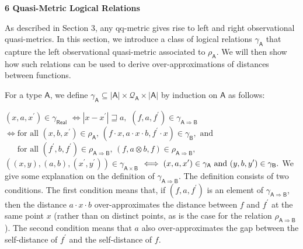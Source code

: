  
 
 


 
\par\medskip\noindent\textbf{6 Quasi-Metric Logical Relations}\par
 
 
As described in Section 3, any qq-metric gives rise to left and right observational quasi-metrics. In this section, we introduce a class of logical relations $\gamma_{\mathsf{A}}$ that capture the left observational quasi-metric associated to $\rho_{{\mathsf{A}}}$. We will then show how such relations can be used to derive over-approximations of distances between functions.\par
 
 
 
For a type $\mathsf{A}$, we define $\gamma_{\mathsf{A}}\subseteq|\mathsf{A}|\times\mathcal{Q}_{\mathsf{A}}\times|%
\mathsf{A}|$ by induction on $\mathsf{A}$ as follows:\par
    $\displaystyle(x,a,x^{\prime})\in\gamma_{\mathsf{Real}}$ $\displaystyle\iff|x-x^{\prime}|\sqsupseteq a,$     $\displaystyle(f,a,f^{\prime})\in\gamma_{\mathsf{A}\Rightarrow\mathsf{B}}$ $\displaystyle\iff\text{for all }(x,b,x^{\prime})\in\rho_{\mathsf{A}},\,(f\cdot
x%
,a\cdot x\cdot b,f^{\prime}\cdot x)\in\gamma_{\mathsf{B}},\text{ and}$      $\displaystyle\mathrel{\phantom{\iff}}\text{for all }(f^{\prime},b,f^{\prime})%
\in\rho_{\mathsf{A}\Rightarrow\mathsf{B}},\,(f,a\otimes b,f)\in\rho_{\mathsf{A%
}\Rightarrow\mathsf{B}},$     $\displaystyle((x,y),(a,b),(x^{\prime},y^{\prime}))\in\gamma_{\mathsf{A}\times%
\mathsf{B}}$ $\displaystyle\iff(x,a,x^{\prime})\in\gamma_{\mathsf{A}}\text{ and }(y,b,y^{%
\prime})\in\gamma_{\mathsf{B}}.$    
We give some explanation on the definition of $\gamma_{\mathsf{A}\Rightarrow\mathsf{B}}$. The definition consists of two conditions. The first condition means that, if $(f,a,f^{\prime})$ is an element of $\gamma_{\mathsf{A}\Rightarrow\mathsf{B}}$, then the distance $a\cdot x\cdot b$ over-approximates the distance between $f$ and $f^{\prime}$ at the same point $x$ (rather than on distinct points, as is the case for the relation $\rho_{\mathsf{A}\Rightarrow\mathsf{B}}$). The second condition means that $a$ also over-approximates the gap between the self-distance of $f^{\prime}$ and the self-distance of $f$.\par
 
